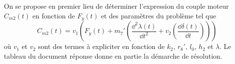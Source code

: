 On se propose en premier lieu de déterminer l’expression du couple moteur $C_{m2}(t)$ en fonction de  $F_y(t)$ et des paramètres du problème tel que
$$C_{m2}(t)=v_1\left( 
F_y(t)+m_7'\left( \dfrac{\dd^2 \lambda(t) }{\dd t^2}+v_2 \left( \dfrac{\dd \delta(t) }{\dd t}\right)
\right)\right)
$$
où $v_1$ et $v_2$ sont des termes à expliciter en fonction de
$k_2$, $r_8'$, $l_0$, $h_2$ et $\lambda$.
Le tableau du document réponse donne en partie la démarche de résolution.


\ifprof
\begin{corrige}
\end{corrige}
\else
\fi


\ifprof
\begin{corrige}
\end{corrige}
\else
\fi

